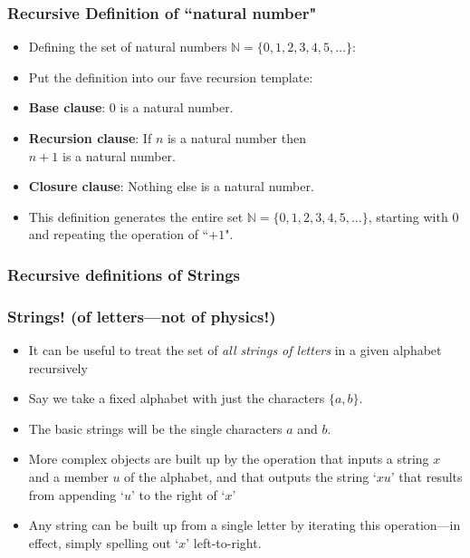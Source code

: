 \begin{frame}
\frametitle{Recursive Definition of ``natural number"}

\begin{itemize}[<+->]

\item Defining the set of natural numbers $\mathbb{N} = \{ 0, 1, 2, 3, 4, 5, \ldots \}$:

\item Put the definition into our fave recursion template:

\bi

\item {\bf{Base clause}}: 0 is a natural number.

\item {\bf{Recursion clause}}: If $n$ is a natural number then \\ \phantom{Recursion clausevv} $n+1$ is a natural number.

\item {\bf{Closure clause}}: Nothing else is a natural number.
\ei

\bigskip 

\item This definition generates the entire set $\mathbb{N} = \{ 0, 1, 2, 3, 4, 5, \ldots \}$, starting with 0 and repeating the operation of ``$+1$".

\end{itemize} 
\end{frame}


\subsubsection{Recursive definitions of Strings}


 \begin{frame}
\frametitle{Strings! (of letters---not of physics!)}

\begin{itemize}[<+->]

\item It can be useful to treat the set of {\it{all strings of letters}} in a given alphabet recursively

\item Say we take a fixed alphabet with just the characters $\{a, b\}$.

\item The basic strings will be the single characters $a$ and $b$.

\item  More complex objects are built up by the operation that inputs a string
$x$ and a member $u$ of the alphabet, and that outputs the string `$xu$' that results from appending `$u$' to the right of `$x$'

\item   Any string can be built up from a single letter by iterating this operation---in effect, simply spelling out `$x$' left-to-right. 

\end{itemize} 
\end{frame}

